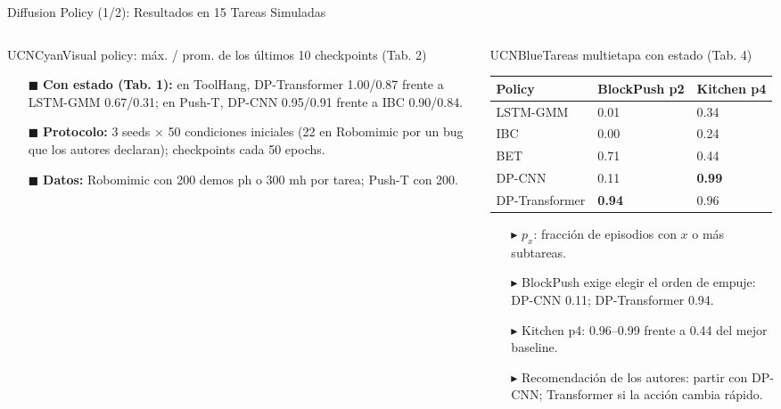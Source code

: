 \documentclass[aspectratio=169,10pt,xcolor={dvipsnames,table}]{beamer}
\newcommand{\CardHeightTall}{46mm}         %
\newcommand{\TabFont}{\fontsize{5.3}{6.4}\selectfont}                    %
\begin{document}
\begin{frame}{Diffusion Policy (1/2): Resultados en 15 Tareas Simuladas}
\begin{columns}[T, onlytextwidth]
\begin{column}{0.585\textwidth}
\begin{Card}[height=\CardHeightTall]{UCNCyan}{Visual policy: máx. / prom. de los últimos 10 checkpoints (Tab. 2)}
{\begin{itemize}
          \item[\textcolor{UCNCyan}{$\blacksquare$}] \textbf{Con estado (Tab. 1):} en ToolHang, DP-Transformer 1.00/0.87 frente a LSTM-GMM 0.67/0.31; en Push-T, DP-CNN 0.95/0.91 frente a IBC 0.90/0.84.
          \item[\textcolor{UCNCyan}{$\blacksquare$}] \textbf{Protocolo:} 3 seeds $\times$ 50 condiciones iniciales (22 en Robomimic por un bug que los autores declaran); checkpoints cada 50 epochs.
          \item[\textcolor{UCNCyan}{$\blacksquare$}] \textbf{Datos:} Robomimic con 200 demos ph o 300 mh por tarea; Push-T con 200.
        \end{itemize}}
      \end{Card}
    \end{column}
    \begin{column}{0.395\textwidth}
      \begin{Card}[height=\CardHeightTall]{UCNBlue}{Tareas multietapa con estado (Tab. 4)}
        {\TabFont
        \setlength{\tabcolsep}{1.4pt}
        \renewcommand{\arraystretch}{1.1}
        \begin{tabular}{@{}L{19mm} C{15mm} C{15mm}@{}}
          \toprule
          \textbf{Policy} & \textbf{BlockPush p2} & \textbf{Kitchen p4} \\
          \midrule
          LSTM-GMM & 0.01 & 0.34 \\
          IBC & 0.00 & 0.24 \\
          BET & 0.71 & 0.44 \\
          DP-CNN & 0.11 & \textbf{0.99} \\
          DP-Transformer & \textbf{0.94} & 0.96 \\
          \bottomrule
        \end{tabular}\par
        \vspace{1.2mm}
        \begin{itemize}\setlength{\itemsep}{0.8pt}
          \item[\textcolor{UCNBlue}{$\blacktriangleright$}] $p_x$: fracción de episodios con $x$ o más subtareas.
          \item[\textcolor{UCNBlue}{$\blacktriangleright$}] BlockPush exige elegir el orden de empuje: DP-CNN 0.11; DP-Transformer 0.94.
          \item[\textcolor{UCNBlue}{$\blacktriangleright$}] Kitchen p4: 0.96--0.99 frente a 0.44 del mejor baseline.
          \item[\textcolor{UCNBlue}{$\blacktriangleright$}] Recomendación de los autores: partir con DP-CNN; Transformer si la acción cambia rápido.
        \end{itemize}}
      \end{Card}
    \end{column}
  \end{columns}
\end{frame}
\end{document}
